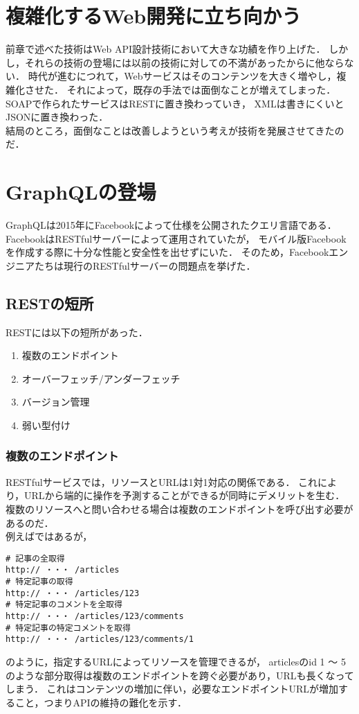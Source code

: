 \documentclass[11pt,a4paper]{jsarticle}
\begin{document}
\section{複雑化するWeb開発に立ち向かう}
前章で述べた技術はWeb API設計技術において大きな功績を作り上げた．
しかし，それらの技術の登場には以前の技術に対しての不満があったからに他ならない．
時代が進むにつれて，Webサービスはそのコンテンツを大きく増やし，複雑化させた．
それによって，既存の手法では面倒なことが増えてしまった．
SOAPで作られたサービスはRESTに置き換わっていき，
XMLは書きにくいとJSONに置き換わった．\\
結局のところ，面倒なことは改善しようという考えが技術を発展させてきたのだ．

\section{GraphQLの登場}
GraphQLは2015年にFacebookによって仕様を公開されたクエリ言語である．
FacebookはRESTfulサーバーによって運用されていたが，
モバイル版Facebookを作成する際に十分な性能と安全性を出せずにいた．
そのため，Facebookエンジニアたちは現行のRESTfulサーバーの問題点を挙げた．
\subsection{RESTの短所}
RESTには以下の短所があった．
\begin{enumerate}
    \item 複数のエンドポイント
    \item オーバーフェッチ/アンダーフェッチ
    \item バージョン管理
    \item 弱い型付け
\end{enumerate}
\subsubsection{複数のエンドポイント}
RESTfulサービスでは，リソースとURLは1対1対応の関係である．
これにより，URLから端的に操作を予測することができるが同時にデメリットを生む．
複数のリソースへと問い合わせる場合は複数のエンドポイントを呼び出す必要があるのだ．\\
例えばではあるが，
\begin{verbatim}
# 記事の全取得
http:// ・・・ /articles
# 特定記事の取得
http:// ・・・ /articles/123
# 特定記事のコメントを全取得
http:// ・・・ /articles/123/comments
# 特定記事の特定コメントを取得
http:// ・・・ /articles/123/comments/1
\end{verbatim}
のように，指定するURLによってリソースを管理できるが，
articlesのid 1 ～ 5のような部分取得は複数のエンドポイントを跨ぐ必要があり，URLも長くなってしまう．
これはコンテンツの増加に伴い，必要なエンドポイントURLが増加すること，つまりAPIの維持の難化を示す．
\end{document}
